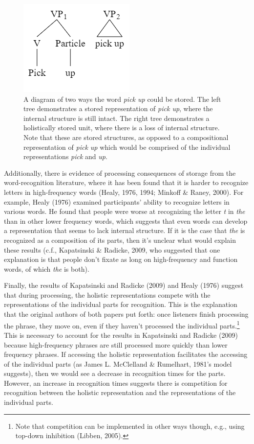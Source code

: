 \documentclass[
  man,floatsintext]{apa6}
\begin{document}
\begin{figure}

{\centering \includegraphics[width=0.3\linewidth]{Figures/syntax_tree} 

}

\caption{A diagram of two ways the word \emph{pick up} could be stored. The left tree demonstrates a stored representation of \emph{pick up}, where the internal structure is still intact. The right tree demonstrates a holistically stored unit, where there is a loss of internal structure. Note that these are stored structures, as opposed to a compositional representation of \emph{pick up} which would be comprised of the individual representations \emph{pick} and \emph{up}.}\label{fig:lossInternal}
\end{figure}

Additionally, there is evidence of processing consequences of storage from the word-recognition literature, where it has been found that it is harder to recognize letters in high-frequency words (Healy, 1976, 1994; Minkoff \& Raney, 2000). For example, Healy (1976) examined participants' ability to recognize letters in various words. He found that people were worse at recognizing the letter \emph{t} in \emph{the} than in other lower frequency words, which suggests that even words can develop a representation that seems to lack internal structure. If it is the case that \emph{the} is recognized as a composition of its parts, then it's unclear what would explain these results (c.f., Kapatsinski \& Radicke, 2009, who suggested that one explanation is that people don't fixate as long on high-frequency and function words, of which \emph{the} is both).

Finally, the results of Kapatsinski and Radicke (2009) and Healy (1976) suggest that during processing, the holistic representations compete with the representations of the individual parts for recognition. This is the explanation that the original authors of both papers put forth: once listeners finish processing the phrase, they move on, even if they haven't processed the individual parts.\footnote{Note that competition can be implemented in other ways though, e.g., using top-down inhibition (Libben, 2005).} This is necessary to account for the results in Kapatsinski and Radicke (2009) because high-frequency phrases are still processed more quickly than lower frequency phrases. If accessing the holistic representation facilitates the accessing of the individual parts (as James L. McClelland \& Rumelhart, 1981's model suggests), then we would see a decrease in recognition times for the parts. However, an increase in recognition times suggests there is competition for recognition between the holistic representation and the representations of the individual parts.
\end{document}
